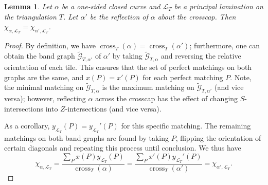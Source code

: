 \documentclass[10pt,a4paper]{amsart}
\numberwithin{equation}{section}
\newtheorem{Lemma}[Theorem]{Lemma}
\theoremstyle{definition}
\begin{document}
\begin{Lemma}\label{lemma:reflections}
 Let $\alpha$ be a one-sided closed curve and $\mathcal{L}_T$ be a principal lamination on the triangulation $T$. Let $\alpha'$ be the reflection of $\alpha$ about the crosscap. Then $\chi_{\alpha, \mathcal{L}_T}=\chi_{\alpha', \mathcal{L}_T}$.
\end{Lemma}
\begin{proof}
 By definition, we have $\operatorname{cross}_T(\alpha)=\operatorname{cross}_T(\alpha')$; furthermore, one can obtain the band graph $\widetilde{\mathcal{G}}_{T, \alpha'}$ of $\alpha'$ by taking $\widetilde{\mathcal{G}}_{T, \alpha}$ and reversing the relative orientation of each tile. This ensures that the set of perfect matchings on both graphs are the same, and $x(P)=x'(P)$ for each perfect matching $P$. Note, the minimal matching on $\widetilde{\mathcal{G}}_{T, \alpha}$ is the maximum matching on $\widetilde{\mathcal{G}}_{T, \alpha'}$ (and vice versa); however, reflecting $\alpha$ across the crosscap has the effect of changing $S$-intersections into $Z$-intersections (and vice versa).

 As a corollary, $y_{\mathcal{L}_T}(P)=y_{\mathcal{L}_T}'(P)$ for this specific matching. The remaining matchings on both band graphs are found by taking $P$, flipping the orientation of certain diagonals and repeating this process until conclusion. We thus have \[\chi_{\alpha, \mathcal{L}_T}=\frac{\sum_P x(P)y_{\mathcal{L}_T}(P)}{\operatorname{cross}_T(\alpha)}=\frac{\sum_{P} x'(P)y_{\mathcal{L}_T}'(P)}{\operatorname{cross}_T(\alpha')}=\chi_{\alpha', \mathcal{L}_T}.\tag*{\qed}\] \renewcommand{\qed}{}
\end{proof}
\end{document}
